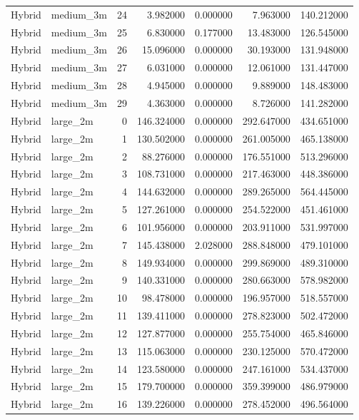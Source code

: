 \begin{tabular}{llrrrrr}
Hybrid & medium_3m & 24 & 3.982000 & 0.000000 & 7.963000 & 140.212000 \\
Hybrid & medium_3m & 25 & 6.830000 & 0.177000 & 13.483000 & 126.545000 \\
Hybrid & medium_3m & 26 & 15.096000 & 0.000000 & 30.193000 & 131.948000 \\
Hybrid & medium_3m & 27 & 6.031000 & 0.000000 & 12.061000 & 131.447000 \\
Hybrid & medium_3m & 28 & 4.945000 & 0.000000 & 9.889000 & 148.483000 \\
Hybrid & medium_3m & 29 & 4.363000 & 0.000000 & 8.726000 & 141.282000 \\
Hybrid & large_2m & 0 & 146.324000 & 0.000000 & 292.647000 & 434.651000 \\
Hybrid & large_2m & 1 & 130.502000 & 0.000000 & 261.005000 & 465.138000 \\
Hybrid & large_2m & 2 & 88.276000 & 0.000000 & 176.551000 & 513.296000 \\
Hybrid & large_2m & 3 & 108.731000 & 0.000000 & 217.463000 & 448.386000 \\
Hybrid & large_2m & 4 & 144.632000 & 0.000000 & 289.265000 & 564.445000 \\
Hybrid & large_2m & 5 & 127.261000 & 0.000000 & 254.522000 & 451.461000 \\
Hybrid & large_2m & 6 & 101.956000 & 0.000000 & 203.911000 & 531.997000 \\
Hybrid & large_2m & 7 & 145.438000 & 2.028000 & 288.848000 & 479.101000 \\
Hybrid & large_2m & 8 & 149.934000 & 0.000000 & 299.869000 & 489.310000 \\
Hybrid & large_2m & 9 & 140.331000 & 0.000000 & 280.663000 & 578.982000 \\
Hybrid & large_2m & 10 & 98.478000 & 0.000000 & 196.957000 & 518.557000 \\
Hybrid & large_2m & 11 & 139.411000 & 0.000000 & 278.823000 & 502.472000 \\
Hybrid & large_2m & 12 & 127.877000 & 0.000000 & 255.754000 & 465.846000 \\
Hybrid & large_2m & 13 & 115.063000 & 0.000000 & 230.125000 & 570.472000 \\
Hybrid & large_2m & 14 & 123.580000 & 0.000000 & 247.161000 & 534.437000 \\
Hybrid & large_2m & 15 & 179.700000 & 0.000000 & 359.399000 & 486.979000 \\
Hybrid & large_2m & 16 & 139.226000 & 0.000000 & 278.452000 & 496.564000 \\

\end{tabular}
